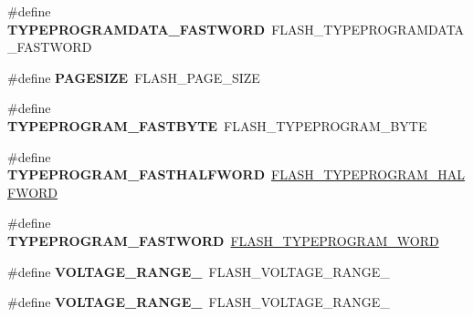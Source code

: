 \begin{DoxyCompactItemize}
\#define {\bfseries T\+Y\+P\+E\+P\+R\+O\+G\+R\+A\+M\+D\+A\+T\+A\+\_\+\+F\+A\+S\+T\+W\+O\+RD}~F\+L\+A\+S\+H\+\_\+\+T\+Y\+P\+E\+P\+R\+O\+G\+R\+A\+M\+D\+A\+T\+A\+\_\+\+F\+A\+S\+T\+W\+O\+RD
\item 
\mbox{\label{group___h_a_l___f_l_a_s_h___aliased___defines_ga519adc2af3ba06a8f0548b6690050a89}} 
\#define {\bfseries P\+A\+G\+E\+S\+I\+ZE}~F\+L\+A\+S\+H\+\_\+\+P\+A\+G\+E\+\_\+\+S\+I\+ZE
\item 
\mbox{\label{group___h_a_l___f_l_a_s_h___aliased___defines_ga07e4cba7de4bf96cfafa957245f9d06d}} 
\#define {\bfseries T\+Y\+P\+E\+P\+R\+O\+G\+R\+A\+M\+\_\+\+F\+A\+S\+T\+B\+Y\+TE}~F\+L\+A\+S\+H\+\_\+\+T\+Y\+P\+E\+P\+R\+O\+G\+R\+A\+M\+\_\+\+B\+Y\+TE
\item 
\mbox{\label{group___h_a_l___f_l_a_s_h___aliased___defines_gad562e3d208ce464a19d5ec356e7f21ff}} 
\#define {\bfseries T\+Y\+P\+E\+P\+R\+O\+G\+R\+A\+M\+\_\+\+F\+A\+S\+T\+H\+A\+L\+F\+W\+O\+RD}~\hyperlink{group___f_l_a_s_h___type___program_ga2b607dfc2efd463a8530e327bc755582}{F\+L\+A\+S\+H\+\_\+\+T\+Y\+P\+E\+P\+R\+O\+G\+R\+A\+M\+\_\+\+H\+A\+L\+F\+W\+O\+RD}
\item 
\mbox{\label{group___h_a_l___f_l_a_s_h___aliased___defines_ga1c170a7eba13377a1922bf6750b1f0ce}} 
\#define {\bfseries T\+Y\+P\+E\+P\+R\+O\+G\+R\+A\+M\+\_\+\+F\+A\+S\+T\+W\+O\+RD}~\hyperlink{group___f_l_a_s_h___type___program_gadd25c6821539030ba6711e7c0d586c3e}{F\+L\+A\+S\+H\+\_\+\+T\+Y\+P\+E\+P\+R\+O\+G\+R\+A\+M\+\_\+\+W\+O\+RD}
\item 
\mbox{\label{group___h_a_l___f_l_a_s_h___aliased___defines_ga5a1b1ceafccd5ab37c7cfbebc9527329}} 
\#define {\bfseries V\+O\+L\+T\+A\+G\+E\+\_\+\+R\+A\+N\+G\+E\+\_}~F\+L\+A\+S\+H\+\_\+\+V\+O\+L\+T\+A\+G\+E\+\_\+\+R\+A\+N\+G\+E\+\_
\item 
\mbox{\label{group___h_a_l___f_l_a_s_h___aliased___defines_ga1c0639cea187d17c4dad607fe124a94f}} 
\#define {\bfseries V\+O\+L\+T\+A\+G\+E\+\_\+\+R\+A\+N\+G\+E\+\_}~F\+L\+A\+S\+H\+\_\+\+V\+O\+L\+T\+A\+G\+E\+\_\+\+R\+A\+N\+G\+E\+\_

\end{DoxyCompactItemize}
